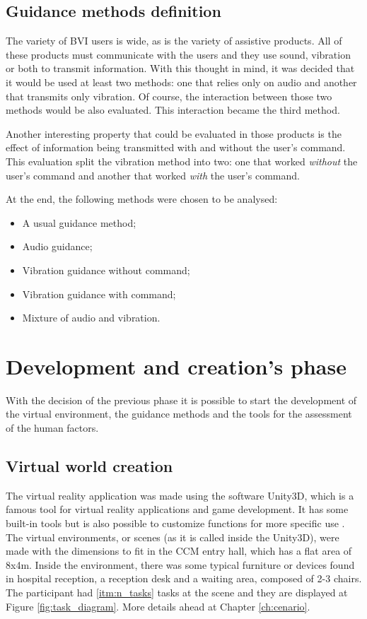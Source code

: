     \subsection{Guidance methods definition}
        The variety of BVI users is wide, as is the variety of assistive products. All of these products must communicate with the users and they use sound, vibration or both to transmit information. With this thought in mind, it was decided that it would be used at least two methods: one that relies only on audio and another that transmits only vibration. Of course, the interaction between those two methods would be also evaluated. This interaction became the third method.
        
        Another interesting property that could be evaluated in those products is the effect of information being transmitted with and without the user's command. This evaluation split the vibration method into two: one that worked \textit{without} the user's command and another that worked \textit{with} the user's command.
        
        At the end, the following methods were chosen to be analysed:
        
        \begin{itemize}
            \item A usual guidance method;
            \item Audio guidance;
            \item Vibration guidance without command;
            \item Vibration guidance with command;
            \item Mixture of audio and vibration.
        \end{itemize}
    
\section{Development and creation's phase}
\label{sec:creation_phase}
    
    With the decision of the previous phase it is possible to start the development of the virtual environment, the guidance methods and the tools for the assessment of the human factors.

    \subsection{Virtual world creation}
        The virtual reality application was made using the software Unity3D, which is a famous tool for virtual reality applications and game development. It has some built-in tools but is also possible to customize functions for more specific use \cite{wang2010new}. The virtual environments, or scenes (as it is called inside the Unity3D), were made with the dimensions to fit in the CCM entry hall, which has a flat area of 8x4m. Inside the environment, there was some typical furniture or devices found in hospital reception, a reception desk and a waiting area, composed of 2-3 chairs. The participant had \ref{itm:n_tasks} tasks at the scene and they are displayed at Figure \ref{fig:task_diagram}. More details ahead at Chapter \ref{ch:cenario}.
        

